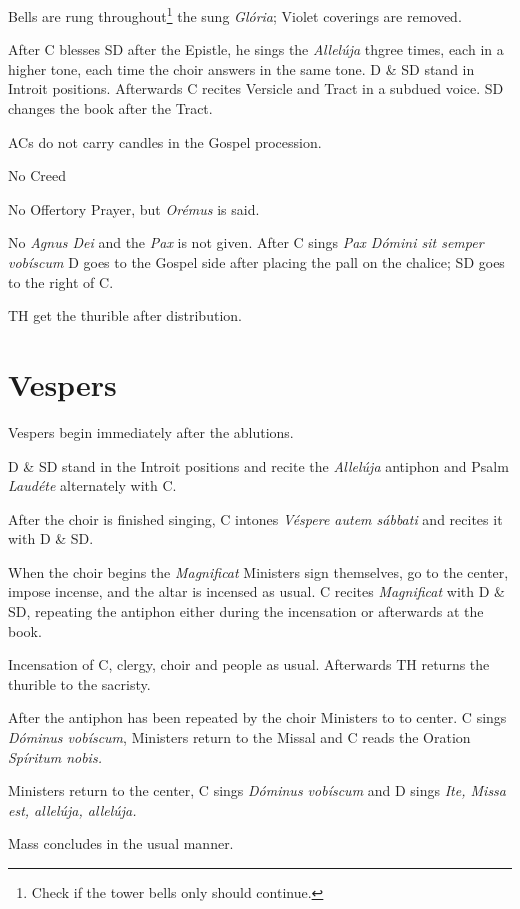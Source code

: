 {\rubric Bells are rung throughout\footnote{Check if the tower bells only should
continue.} the sung \textit{Glória}; Violet coverings are removed.

\rubric After C blesses SD after the Epistle, he sings the \textit{Allelúja}
thgree times, each in a higher tone, each time the choir answers in the same
tone. D \& SD stand in Introit positions. Afterwards C recites Versicle and
Tract in a subdued voice. SD changes the book after the Tract.

\rubric ACs do not carry candles in the Gospel procession.

\rubric No Creed

\rubric No Offertory Prayer, but \textit{Orémus} is said.

\rubric No \textit{Agnus Dei} and the \textit{Pax} is not given. After C sings
\textit{Pax Dómini sit semper vobíscum} D goes to the Gospel side after placing
the pall on the chalice; SD goes to the right of C.

\rubric TH get the thurible after distribution.

\section{Vespers}

\rubric Vespers begin immediately after the ablutions.

\rubric D \& SD stand in the Introit positions and recite the \textit{Allelúja}
antiphon and Psalm \textit{Laudéte} alternately with C.

\rubric After the choir is finished singing, C intones \textit{Véspere autem
sábbati} and recites it with D \& SD.

\rubric When the choir begins the \textit{Magnificat} Ministers sign
themselves, go to the center, impose incense, and the altar is incensed as
usual. C recites \textit{Magnificat} with D \& SD, repeating the antiphon
either during the incensation or afterwards at the book.

\rubric Incensation of C, clergy, choir and people as usual. Afterwards TH
returns the thurible to the sacristy.

\rubric After the antiphon has been repeated by the choir Ministers to to
center. C sings \textit{Dóminus vobíscum}, Ministers return to the Missal and C
reads the Oration \textit{Spíritum nobis.}

\rubric Ministers return to the center, C sings \textit{Dóminus vobíscum} and D
sings \textit{Ite, Missa est, allelúja, allelúja.}

\rubric Mass concludes in the usual manner.

}

